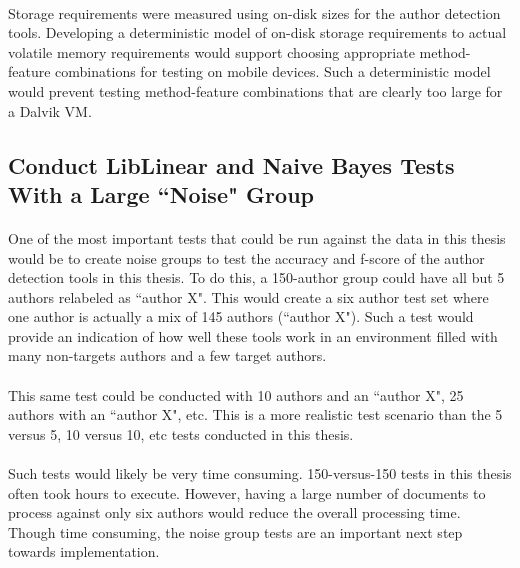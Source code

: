 	\paragraph*{} Storage requirements were measured using on-disk sizes for the author detection tools.  Developing a deterministic model of on-disk storage requirements to actual volatile memory requirements would support choosing appropriate method-feature combinations for testing on mobile devices.  Such a deterministic model would prevent testing method-feature combinations that are clearly too large for a Dalvik VM.

\begin{singlespace}
\subsection{Conduct LibLinear and Naive Bayes Tests With a Large ``Noise" Group}
\end{singlespace}
\paragraph*{} One of the most important tests that could be run against the data in this thesis would be to create noise groups to test the accuracy and f-score of the author detection tools in this thesis.  To do this, a 150-author group could have all but 5 authors relabeled as ``author X".  This would create a six author test set where one author is actually a mix of 145 authors (``author X").  Such a test would provide an indication of how well these tools work in an environment filled with many non-targets authors and a few target authors.
\paragraph*{} This same test could be conducted with 10 authors and an ``author X", 25 authors with an ``author X", etc.  This is a more realistic test scenario than the 5 versus 5, 10 versus 10, etc tests conducted in this thesis.  
\paragraph*{} Such tests would likely be very time consuming.  150-versus-150 tests in this thesis often took hours to execute. However, having a large number of documents to process against only six authors would reduce the overall processing time.  Though time consuming, the noise group tests are an important next step towards implementation.

